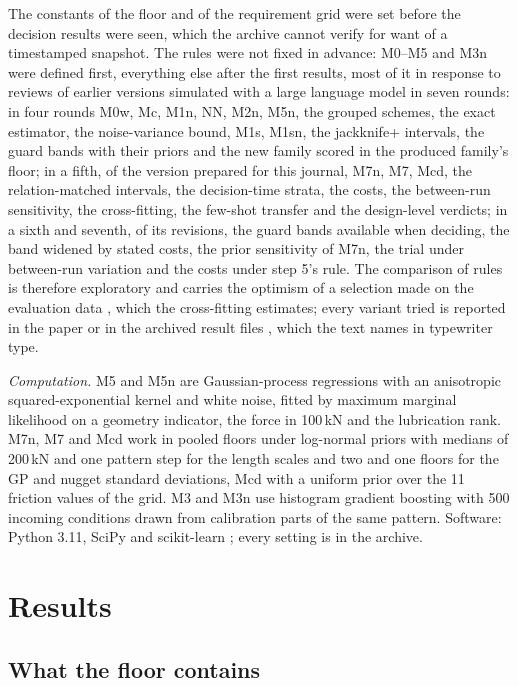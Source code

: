 \documentclass[pdflatex,sn-basic,lineno]{sn-jnl}
\begin{document}
The constants of the floor and of the requirement grid were set before the decision results were seen, which the archive cannot verify for want of a timestamped snapshot. The rules were not fixed in advance: M0--M5 and M3n were defined first, everything else after the first results, most of it in response to reviews of earlier versions simulated with a large language model in seven rounds: in four rounds M0w, Mc, M1n, NN, M2n, M5n, the grouped schemes, the exact estimator, the noise-variance bound, M1s, M1sn, the jackknife+ intervals, the guard bands with their priors and the new family scored in the produced family's floor; in a fifth, of the version prepared for this journal, M7n, M7, Mcd, the relation-matched intervals, the decision-time strata, the costs, the between-run sensitivity, the cross-fitting, the few-shot transfer and the design-level verdicts; in a sixth and seventh, of its revisions, the guard bands available when deciding, the band widened by stated costs, the prior sensitivity of M7n, the trial under between-run variation and the costs under step 5's rule. The comparison of rules is therefore exploratory and carries the optimism of a selection made on the evaluation data \citep{cawley2010over, varma2006bias}, which the cross-fitting estimates; every variant tried is reported in the paper or in the archived result files \citep{canseven2026archive}, which the text names in typewriter type.

\emph{Computation.} M5 and M5n are Gaussian-process regressions with an anisotropic squared-exponential kernel and white noise, fitted by maximum marginal likelihood on a geometry indicator, the force in 100\,kN and the lubrication rank. M7n, M7 and Mcd work in pooled floors under log-normal priors with medians of 200\,kN and one pattern step for the length scales and two and one floors for the GP and nugget standard deviations, Mcd with a uniform prior over the 11 friction values of the grid. M3 and M3n use histogram gradient boosting with 500 incoming conditions drawn from calibration parts of the same pattern. Software: Python 3.11, SciPy and scikit-learn \citep{pedregosa2011scikit}; every setting is in the archive.

\section{Results}\label{sec:results}

\subsection{What the floor contains}\label{sec:res-floor}
\end{document}
